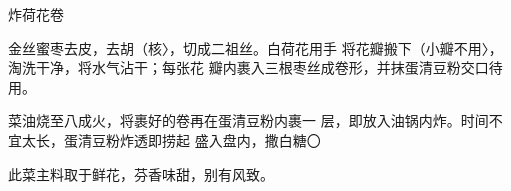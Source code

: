 \begin{recipe}{炸荷花卷}

\ingredients


\cooking

金丝蜜枣去皮，去胡（核〉，切成二祖丝。白荷花用手 将花瓣搬下（小瓣不用〉，淘洗干净，将水气沾干；每张花 瓣内裹入三根枣丝成卷形，并抹蛋清豆粉交口待用。

\step 菜油烧至八成火，将裹好的卷再在蛋清豆粉内裹一 层，即放入油锅内炸。时间不宜太长，蛋清豆粉炸透即捞起 盛入盘内，撒白糖〇

\notes

此菜主料取于鲜花，芬香味甜，别有风致。

\end{recipe}

